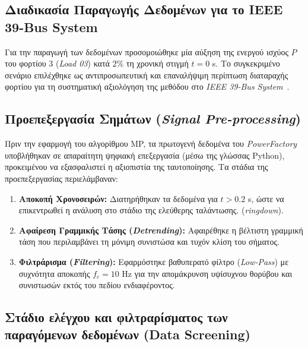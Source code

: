 \documentclass[conference]{IEEEtran}
\begin{document}
\subsection{Διαδικασία Παραγωγής Δεδομένων για το IEEE 39-Bus System}
Για την παραγωγή των δεδομένων προσομοιώθηκε μία αύξηση της ενεργού ισχύος $P$ του φορτίου $3$ (\textit{Load 03}) κατά $2\%$ τη χρονική στιγμή $t = 0$ s. Το συγκεκριμένο σενάριο επιλέχθηκε ως αντιπροσωπευτική και επαναλήψιμη περίπτωση διαταραχής φορτίου για τη συστηματική αξιολόγηση της μεθόδου στο \textit{IEEE 39-Bus System}~\cite{digsilent39,sfetkos2024measurement}.

\subsection{Προεπεξεργασία Σημάτων (\textit{Signal Pre-processing})}
Πριν την εφαρμογή του αλγορίθμου MP, τα πρωτογενή δεδομένα του \textit{PowerFactory} υποβλήθηκαν σε απαραίτητη ψηφιακή επεξεργασία (μέσω της γλώσσας Python), προκειμένου να εξασφαλιστεί η αξιοπιστία της ταυτοποίησης. Τα στάδια της προεπεξεργασίας περιελάμβαναν:

\begin{enumerate}
    \item \textbf{Αποκοπή Χρονοσειρών:} Διατηρήθηκαν τα δεδομένα για $t > 0.2$ s, ώστε να επικεντρωθεί η ανάλυση στο στάδιο της ελεύθερης ταλάντωσης. (\textit{ringdown}).
    \item \textbf{Αφαίρεση Γραμμικής Τάσης (\textit{Detrending}):} Αφαιρέθηκε η βέλτιστη γραμμική τάση που περιλαμβάνει τη μόνιμη συνιστώσα και τυχόν κλίση του σήματος.
    \item \textbf{Φιλτράρισμα (\textit{Filtering}):} Εφαρμόστηκε βαθυπερατό φίλτρο (\textit{Low-Pass}) με συχνότητα αποκοπής $f_{c} = 10$ Hz για την απομάκρυνση υψίσυχνου θορύβου και συνιστωσών εκτός του πεδίου ενδιαφέροντος.
\end{enumerate}

\subsection{Στάδιο ελέγχου και φιλτραρίσματος των παραγόμενων δεδομένων (Data Screening)}
\label{subsec:data_screening}
\end{document}
